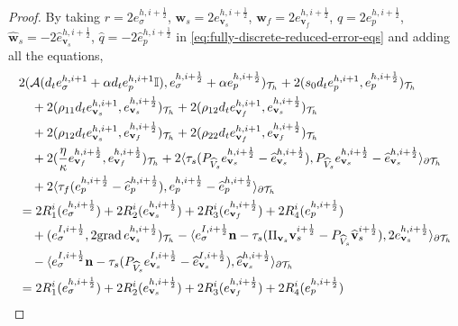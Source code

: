 \documentclass[10pt,letterpaper]{amsart}
\theoremstyle{plain} %
\theoremstyle{remark} %
\newcommand{\vect}[1]{\mathbf{#1}}
\newcommand{\grad}{\mathrm{grad}\,}
\newcommand{\Id}{\mathbb{I}} %
\newcommand{\Ael}{\mathcal{A}} %
\newcommand{\Thprod}[2]{( #1, #2 )_{\mathcal{T}_h}}
\newcommand{\pThprod}[2]{\langle #1, #2 \rangle_{\partial \mathcal{T}_{h}}}
\begin{document}
\begin{proof}
By taking $r = 2 e_{\sigma}^{h,i+\frac 12}$, $\vect{w}_{s} = 2e_{\vect{v}_{s}}^{h,i+\frac 12}$, $\vect{w}_{f} = 2e_{\vect{v}_{f}}^{h,i+\frac 12}$, $q = 2e_p^{h,i+\frac 12}$, $\widehat{\vect{w}}_{s} = -2\widehat{e}_{\vect{v}_{s}}^{h,i+\frac 12}$, $\widehat{q}=-2\widehat{e}_{p}^{h,i+\frac 12}$ in \eqref{eq:fully-discrete-reduced-error-eqs} and adding all the equations, 
%
\begin{align}
	\label{eq:fully-discrete-energy-identity}
	&2 \Thprod{\Ael(d_t e_{\sigma}^{h,i+1} + \alpha d_te_{p}^{h,i+1} \Id)}{e_{\sigma}^{h,i+\frac 12} + \alpha e_p^{h,i+\frac 12}} + 2 \Thprod{s_{0}d_t e_{p}^{h,i+1}}{e_p^{h,i+\frac 12}}
	\\
	\notag
	&\quad + 2\Thprod{\rho_{11}d_t e_{\vect{v}_{s}}^{h,i+1}}{e_{\vect{v}_{s}}^{h,i+\frac 12}} + 2\Thprod{\rho_{12}d_t e_{\vect{v}_{f}}^{h,i+1}}{e_{\vect{v}_{s}}^{h,i+\frac 12}} 
	\\
	\notag
	&\quad + 2\Thprod{\rho_{12}d_t e_{\vect{v}_{s}}^{h,i+1}}{e_{\vect{v}_{f}}^{h,i+\frac 12}} + 2\Thprod{\rho_{22}d_t e_{\vect{v}_{f}}^{h,i+1}}{e_{\vect{v}_{f}}^{h,i+\frac 12}} 
	\\
	\notag
	&\quad + 2 \Thprod{\frac{\eta}{\kappa} e_{\vect{v}_{f}}^{h,i+\frac 12}}{e_{\vect{v}_{f}}^{h,i+\frac 12}} + 2\pThprod{\tau_{s} ({P_{\widehat{V}_s}} e_{\vect{v}_{s}}^{h, i+\frac 12} - \widehat{e}_{\vect{v}_{s}}^{h,i+\frac 12})}{{P_{\widehat{V}_s}} e_{\vect{v}_{s}}^{h,i+\frac 12} - \widehat{e}_{\vect{v}_{s}}^{h,i+\frac 12}} 
	\\
	\notag 
	&\quad + 2\pThprod{\tau_{f} (e_{p}^{h,i+\frac 12} - \widehat{e}_{p}^{h,i+\frac 12})}{e_{p}^{h,i+\frac 12} - \widehat{e}_{p}^{h,i+\frac 12}}
	\\
	\notag
	&= 2 R_1^i(e_{\sigma}^{h,i+\frac 12}) + 2 R_2^i(e_{\vect{v}_s}^{h,i+\frac 12}) + 2 R_3^i(e_{\vect{v}_f}^{h,i+\frac 12}) + 2 R_4^i(e_{p}^{h,i+\frac 12}) 
	\\
	\notag 
	&\quad + \Thprod{e_{\sigma}^{I,i+\frac 12}}{2 \grad e_{\vect{v}_{s}}^{h,i+\frac 12}} - \pThprod{e_{\sigma}^{I,i+\frac 12} \vect{n} - \tau_s (\Pi_{\vect{v}_s} \vect{v}_{s}^{i+\frac 12} - {P_{\widehat{V}_s}}\widehat{\vect{v}}_{s}^{i+\frac 12})}{2e_{\vect{v}_{s}}^{h,i+\frac 12}} 
	\\
	\notag 
	&\quad - \pThprod{e_{\sigma}^{I,i+\frac 12} \vect{n} - \tau_{s} ({P_{\widehat{V}_s}} e_{\vect{v}_{s}}^{I,i+\frac 12} - \widehat{e}_{\vect{v}_{s}}^{I,i+\frac 12})}{\widehat{e}_{\vect{v}_{s}}^{h, i+\frac 12}}
	\\
	\notag
	&= 2 R_1^i(e_{\sigma}^{h,i+\frac 12}) + 2 R_2^i(e_{\vect{v}_s}^{h,i+\frac 12}) + 2 R_3^i(e_{\vect{v}_f}^{h,i+\frac 12}) + 2 R_4^i(e_{p}^{h,i+\frac 12}) 

\end{align}
\end{proof}
\end{document}
